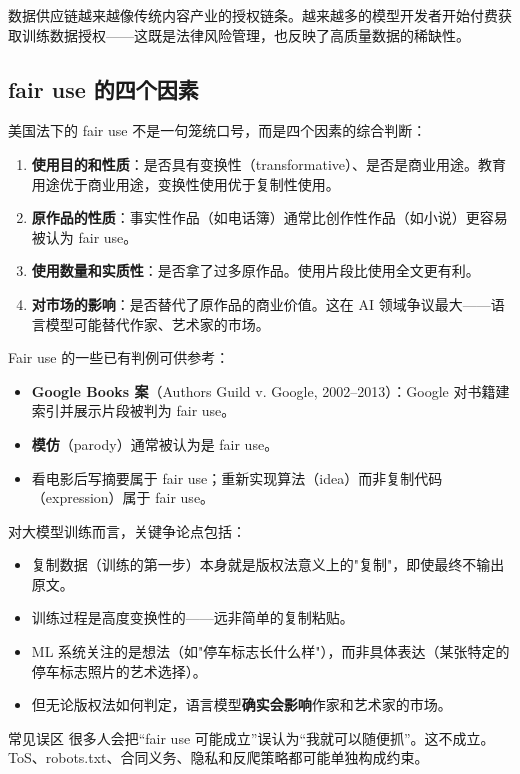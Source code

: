 \documentclass[a4paper]{article}
\begin{document}
数据供应链越来越像传统内容产业的授权链条。越来越多的模型开发者开始付费获取训练数据授权——这既是法律风险管理，也反映了高质量数据的稀缺性。

\subsection{fair use 的四个因素}

美国法下的 fair use 不是一句笼统口号，而是四个因素的综合判断：
\begin{enumerate}
    \item \textbf{使用目的和性质}：是否具有变换性（transformative）、是否是商业用途。教育用途优于商业用途，变换性使用优于复制性使用。
    \item \textbf{原作品的性质}：事实性作品（如电话簿）通常比创作性作品（如小说）更容易被认为 fair use。
    \item \textbf{使用数量和实质性}：是否拿了过多原作品。使用片段比使用全文更有利。
    \item \textbf{对市场的影响}：是否替代了原作品的商业价值。这在 AI 领域争议最大——语言模型可能替代作家、艺术家的市场。
\end{enumerate}

Fair use 的一些已有判例可供参考：
\begin{itemize}
    \item \textbf{Google Books 案}（Authors Guild v. Google, 2002--2013）：Google 对书籍建索引并展示片段被判为 fair use。
    \item \textbf{模仿}（parody）通常被认为是 fair use。
    \item 看电影后写摘要属于 fair use；重新实现算法（idea）而非复制代码（expression）属于 fair use。
\end{itemize}

对大模型训练而言，关键争论点包括：
\begin{itemize}
    \item 复制数据（训练的第一步）本身就是版权法意义上的"复制"，即使最终不输出原文。
    \item 训练过程是高度变换性的——远非简单的复制粘贴。
    \item ML 系统关注的是想法（如"停车标志长什么样"），而非具体表达（某张特定的停车标志照片的艺术选择）。
    \item 但无论版权法如何判定，语言模型\textbf{确实会影响}作家和艺术家的市场。
\end{itemize}

\begin{warningbox}{常见误区}
很多人会把“fair use 可能成立”误认为“我就可以随便抓”。这不成立。ToS、robots.txt、合同义务、隐私和反爬策略都可能单独构成约束。
\end{warningbox}
\end{document}
